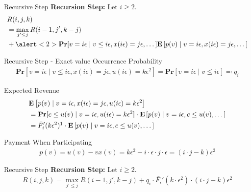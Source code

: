 \documentclass{beamer}
\begin{document}
\begin{frame}{Recursive Step}
  \textbf{Recursion Step:}
  Let $i \geq 2$.
  \begin{align*}
     & R(i,j,k)                                                                                                                                                                          \\
     & = \max_{j' \leq j} R(i-1, j', k-j)                                                                                                                                                \\
     & + \alert<2>{\mathbf{Pr}[v = i\epsilon \mid v \leq i \epsilon, x(i\epsilon) = j\epsilon, \dots ] \mathbf{E}\left[p(v) \mid v = i\epsilon, x(i\epsilon) = j\epsilon, \dots \right]}
  \end{align*}
\end{frame}

\begin{frame}{Recursive Step - Exact value}
  Occurrence Probability
  \begin{align*}
    \mathbf{Pr}[v = i\epsilon \mid v \leq i \epsilon, x(i\epsilon) = j\epsilon, u(i\epsilon) = k\epsilon^2] = \mathbf{Pr}[v = i\epsilon \mid v \leq i \epsilon] \eqcolon q_i
  \end{align*}

  Expected Revenue
  \begin{align*}
     & \mathbf{E}\left[p(v) \mid v = i\epsilon, x(i\epsilon) = j\epsilon, u(i\epsilon) = k\epsilon^2 \right]                                               \\
     & = \mathbf{Pr}[c \leq u(v) \mid v = i\epsilon, u(i\epsilon) = k\epsilon^2] \cdot \mathbf{E}\left[p(v) \mid v = i\epsilon, c \leq u(v), \dots \right] \\
     & = \bar{F}'_i(k \epsilon^2) \footnotemark[1] \cdot \mathbf{E}\left[p(v) \mid v = i\epsilon, c \leq u(v), \dots \right]
  \end{align*}

  Payment When Participating
  \begin{align*}
    p(v) = u(v) - v x(v) = k\epsilon^2 - i \cdot \epsilon \cdot j \cdot \epsilon = (i \cdot j - k) \epsilon^2
  \end{align*}

\end{frame}

\begin{frame}{Recursive Step}
  \textbf{Recursion Step:}
  Let $i \geq 2$.
  \begin{align*}
    R(i,j,k) = \max_{j' \leq j} R(i-1, j', k-j) + q_i \cdot \bar{F_i}'(k \cdot \epsilon^2) \cdot (i\cdot j - k) \epsilon^2
  \end{align*}
\end{frame}
\end{document}
